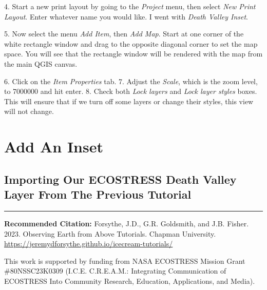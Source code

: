 \documentclass[oneside,a4paper,11pt,explicit]{book}
\begin{document}
\clearpage

\vspace*{3.25 em}

4. Start a new print layout by going to the \textit{Project} menu, then select \textit{New Print Layout}. Enter whatever name you would like. I went with \textit{Death Valley Inset}.

5. Now select the menu \textit{Add Item}, then \textit{Add Map}. Start at one corner of the white rectangle window and drag to the opposite diagonal corner to set the map space. You will see that the rectangle window will be rendered with the map from the main QGIS canvas.

6. Click on the \textit{Item Properties} tab.
7. Adjust the \textit{Scale}, which is the zoom level, to 7000000 and hit enter.
8. Check both \textit{Lock layers} and \textit{Lock layer styles} boxes. This will ensure that if we turn off some layers or change their styles, this view will not change.


\section{Add An Inset}

\subsection{Importing Our ECOSTRESS Death Valley Layer From The Previous Tutorial}

\vfill

\hrule

\vspace{2em}

\textbf{Recommended Citation:} Forsythe, J.D., G.R. Goldsmith, and J.B. Fisher. 2023. Observing Earth from Above Tutorials. Chapman University. \url{https://jeremydforsythe.github.io/icecream-tutorials/}

\vspace{1em}

This work is supported by funding from NASA ECOSTRESS Mission Grant \#80NSSC23K0309 (I.C.E. C.R.E.A.M.: Integrating Communication of ECOSTRESS Into Community Research, Education, Applications, and Media).
\end{document}
